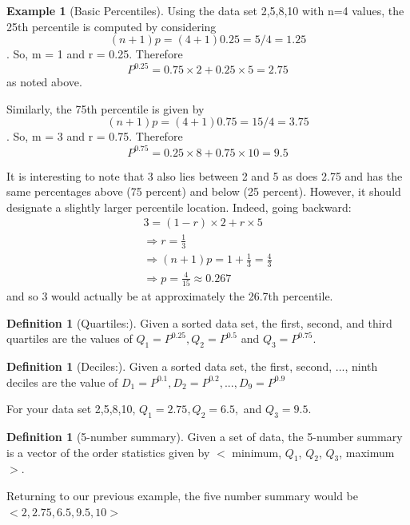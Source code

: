 \documentclass[10pt,]{book}
\theoremstyle{plain}
\theoremstyle{definition}
\newtheorem{definition}[theorem]{Definition}
\theoremstyle{definition}
\newtheorem{example}[theorem]{Example}
\theoremstyle{definition}
\numberwithin{equation}{section}
\newcommand{\lt}{ < }
\newcommand{\gt}{ > }
\begin{document}
\begin{example}[Basic Percentiles]\label{example-5}
Using the data set {2,5,8,10} with n=4 values, the 25th percentile is computed by considering 
		\begin{equation*}(n+1)p = (4+1)0.25 = 5/4 = 1.25\end{equation*}.  
		So, m = 1 and r = 0.25. Therefore 
		\begin{equation*}P^{0.25} = 0.75 \times 2 + 0.25 \times 5 = 2.75\end{equation*} 
		as noted above. 
\par

		Similarly, the 75th percentile is given by
		\begin{equation*}(n+1)p = (4+1)0.75 = 15/4 = 3.75\end{equation*}.  
		So, m = 3 and r = 0.75. Therefore 
		\begin{equation*}P^{0.75} = 0.25 \times 8 + 0.75 \times 10 = 9.5\end{equation*} 
		
		It is interesting to note that 3 also lies between 2 and 5 as does 2.75 and has the same percentages above (75 percent) and below (25 percent). However, it should designate a slightly larger percentile location. Indeed, going backward:
		\begin{gather*}
3 = (1-r) \times 2 + r \times 5\\
\Rightarrow r = \frac{1}{3}\\
\Rightarrow (n+1)p = 1 + \frac{1}{3} = \frac{4}{3}\\
\Rightarrow p = \frac{4}{15} \approx 0.267
\end{gather*}
		and so 3 would actually be at approximately the 26.7th percentile.
\end{example}
\begin{definition}[Quartiles:]\label{definition-4}
Given a sorted data set, the first, second, and third quartiles are the values of 
	\(Q_1 = P^{0.25}, Q_2 = P^{0.5}\) and \(Q_3 = P^{0.75}\).
\end{definition}
\begin{definition}[Deciles:]\label{definition-5}
Given a sorted data set, the first, second, ..., ninth deciles are the value of 
	\(D_1 = P^{0.1}, D_2 = P^{0.2}, ... , D_9 = P^{0.9}\)
\end{definition}
\par

	For your data set {2,5,8,10}, 
	\(Q_1 = 2.75, Q_2 = 6.5,\) and \(Q_3 = 9.5\).
\begin{definition}[5-number summary]\label{definition-6}
Given a set of data, the 5-number summary is a vector of the order statistics given by \(\lt\) minimum, \(Q_1\), \(Q_2\), \(Q_3\), maximum \(\gt\). 
\end{definition}
\par
Returning to our previous example, the five number summary would be
	\(\lt 2, 2.75, 6.5, 9.5, 10 \gt\)
\typeout{************************************************}
\typeout{************************************************}
\end{document}
